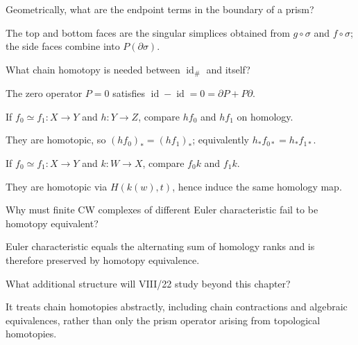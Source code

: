 \begin{problem}\label{prob:viii20-17}
Geometrically, what are the endpoint terms in the boundary of a prism?
\end{problem}
\begin{solution}
The top and bottom faces are the singular simplices obtained from \(g\circ\sigma\) and \(f\circ\sigma\); the side faces combine into \(P(\partial\sigma)\).
\end{solution}

\begin{problem}\label{prob:viii20-18}
What chain homotopy is needed between \(\operatorname{id}_\#\) and itself?
\end{problem}
\begin{solution}
The zero operator \(P=0\) satisfies \(\operatorname{id}-\operatorname{id}=0=\partial P+P\partial\).
\end{solution}

\begin{problem}\label{prob:viii20-19}
If \(f_0\simeq f_1:X\to Y\) and \(h:Y\to Z\), compare \(hf_0\) and \(hf_1\) on homology.
\end{problem}
\begin{solution}
They are homotopic, so \((hf_0)_*=(hf_1)_*\); equivalently \(h_*f_{0*}=h_*f_{1*}\).
\end{solution}

\begin{problem}[Precomposition]\label{prob:viii20-20}
If \(f_0\simeq f_1:X\to Y\) and \(k:W\to X\), compare \(f_0k\) and \(f_1k\).
\end{problem}
\begin{solution}
They are homotopic via \(H(k(w),t)\), hence induce the same homology map.
\end{solution}

\begin{problem}\label{prob:viii20-21}
Why must finite CW complexes of different Euler characteristic fail to be homotopy equivalent?
\end{problem}
\begin{solution}
Euler characteristic equals the alternating sum of homology ranks and is therefore preserved by homotopy equivalence.
\end{solution}

\begin{problem}\label{prob:viii20-22}
What additional structure will VIII/22 study beyond this chapter?
\end{problem}
\begin{solution}
It treats chain homotopies abstractly, including chain contractions and algebraic equivalences, rather than only the prism operator arising from topological homotopies.
\end{solution}
